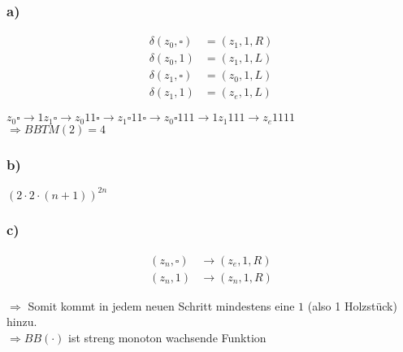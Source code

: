 \documentclass[a4paper,12pt]{article}
\begin{document}
	\subsubsection*{a)}
	\begin{align*}
		\delta\left( z_0, \square\right) &= \left( z_1, 1, R\right)\\
		\delta\left( z_0, 1\right) &= \left( z_1, 1, L\right)\\
		\delta\left( z_1, \square\right) &= \left( z_0, 1, L\right)\\
		\delta\left( z_1, 1\right) &= \left( z_e, 1, L\right)
	\end{align*}
	\begin{center}
		$z_0 \square \rightarrow 1 z_1 \square \rightarrow z_0 1 1 \square \rightarrow z_1 \square 1 1 \square \rightarrow z_0 \square 1 1 1 \rightarrow 1 z_1 1 1 1 \rightarrow z_e 1 1 1 1$\\
		
		$\Rightarrow BBTM\left( 2\right) = 4$
	\end{center}

	\subsubsection*{b)}
	\begin{center}
		$\left( 2 \cdot 2 \cdot \left( n + 1\right)\right)^{2n}$
	\end{center}
	
	\subsubsection*{c)}
	\begin{align*}
		\left( z_n, \square \right) &\rightarrow \left(z_e, 1, R\right)\\
		\left( z_n, 1 \right) &\rightarrow \left(z_n, 1, R\right)
	\end{align*}
	\begin{center}
		$\Rightarrow$ Somit kommt in jedem neuen Schritt mindestens eine $1$ (also 1 Holzstück) hinzu.\\
		$\Rightarrow BB\left( \cdot\right)$ ist streng monoton wachsende Funktion
	\end{center}
\end{document}
